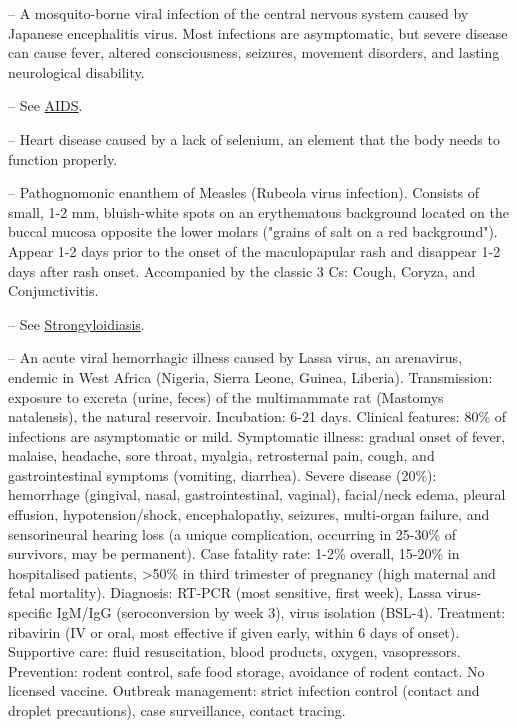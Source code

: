 -- A mosquito-borne viral infection of the central nervous system caused by Japanese encephalitis virus. Most infections are asymptomatic, but severe disease can cause fever, altered consciousness, seizures, movement disorders, and lasting neurological disability.

-- See \hyperlink{AIDS}{AIDS}.

-- Heart disease caused by a lack of selenium, an element that the body needs to function properly.

-- Pathognomonic enanthem of Measles (Rubeola virus infection). Consists of small, 1-2 mm, bluish-white spots on an erythematous background located on the buccal mucosa opposite the lower molars ("grains of salt on a red background"). Appear 1-2 days prior to the onset of the maculopapular rash and disappear 1-2 days after rash onset. Accompanied by the classic 3 Cs: Cough, Coryza, and Conjunctivitis.

-- See \hyperlink{Strongyloidiasis}{Strongyloidiasis}.

-- An acute viral hemorrhagic illness caused by Lassa virus, an arenavirus, endemic in West Africa (Nigeria, Sierra Leone, Guinea, Liberia). Transmission: exposure to excreta (urine, feces) of the multimammate rat (Mastomys natalensis), the natural reservoir. Incubation: 6-21 days. Clinical features: 80\% of infections are asymptomatic or mild. Symptomatic illness: gradual onset of fever, malaise, headache, sore throat, myalgia, retrosternal pain, cough, and gastrointestinal symptoms (vomiting, diarrhea). Severe disease (20\%): hemorrhage (gingival, nasal, gastrointestinal, vaginal), facial/neck edema, pleural effusion, hypotension/shock, encephalopathy, seizures, multi-organ failure, and sensorineural hearing loss (a unique complication, occurring in 25-30\% of survivors, may be permanent). Case fatality rate: 1-2\% overall, 15-20\% in hospitalised patients, >50\% in third trimester of pregnancy (high maternal and fetal mortality). Diagnosis: RT-PCR (most sensitive, first week), Lassa virus-specific IgM/IgG (seroconversion by week 3), virus isolation (BSL-4). Treatment: ribavirin (IV or oral, most effective if given early, within 6 days of onset). Supportive care: fluid resuscitation, blood products, oxygen, vasopressors. Prevention: rodent control, safe food storage, avoidance of rodent contact. No licensed vaccine. Outbreak management: strict infection control (contact and droplet precautions), case surveillance, contact tracing.

